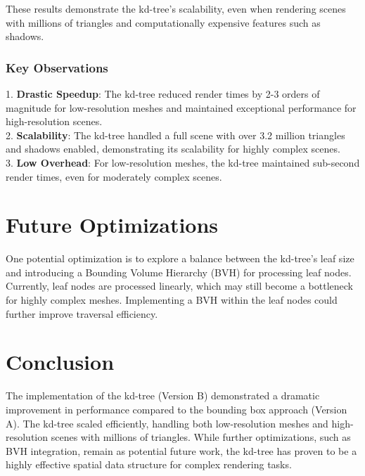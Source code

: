 \documentclass[unicode,11pt,a4paper,oneside,numbers=endperiod,openany]{scrartcl}
\begin{document}
These results demonstrate the kd-tree's scalability, even when rendering scenes with millions of triangles and computationally expensive features such as shadows.

\subsubsection*{Key Observations}
1. \textbf{Drastic Speedup}: The kd-tree reduced render times by 2-3 orders of magnitude for low-resolution meshes and maintained exceptional performance for high-resolution scenes.
\\
2. \textbf{Scalability}: The kd-tree handled a full scene with over 3.2 million triangles and shadows enabled, demonstrating its scalability for highly complex scenes.
\\
3. \textbf{Low Overhead}: For low-resolution meshes, the kd-tree maintained sub-second render times, even for moderately complex scenes.

\section{Future Optimizations}
One potential optimization is to explore a balance between the kd-tree's leaf size and introducing a Bounding Volume Hierarchy (BVH) for processing leaf nodes. Currently, leaf nodes are processed linearly, which may still become a bottleneck for highly complex meshes. Implementing a BVH within the leaf nodes could further improve traversal efficiency.

\section{Conclusion}
The implementation of the kd-tree (Version B) demonstrated a dramatic improvement in performance compared to the bounding box approach (Version A). The kd-tree scaled efficiently, handling both low-resolution meshes and high-resolution scenes with millions of triangles. While further optimizations, such as BVH integration, remain as potential future work, the kd-tree has proven to be a highly effective spatial data structure for complex rendering tasks.
\end{document}
